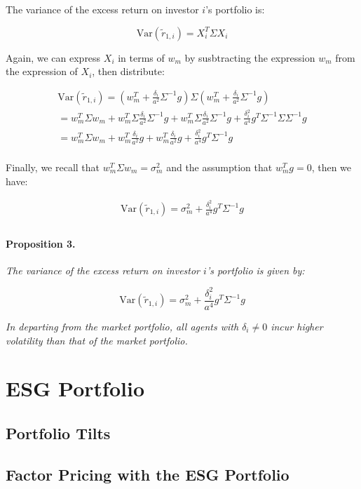 The variance of the excess return on investor $i$'s portfolio is:

\begin{equation}
    \text{Var}(\tilde{r}_{1,i}) = X_i^T \Sigma X_i
\end{equation}

Again, we can express $X_i$ in terms of $w_m$ by susbtracting the expression $w_m$
from the expression of $X_i$, then distribute:

\begin{equation}
    \begin{aligned}
        \text{Var}(\tilde{r}_{1,i}) = (w^T_m + \frac{\delta_i}{a^2} \Sigma^{-1}g) \Sigma (w^T_m + \frac{\delta_i}{a^2} \Sigma^{-1}g) \\
        = w^T_m \Sigma w_m + w^T_m \Sigma \frac{\delta_i}{a^2} \Sigma^{-1}g + w^T_m \Sigma \frac{\delta_i}{a^2} \Sigma^{-1}g + \frac{\delta_i^2}{a^4} g^T \Sigma^{-1} \Sigma \Sigma^{-1} g \\
        = w^T_m \Sigma w_m + w^T_m \frac{\delta_i}{a^2} g + w^T_m \frac{\delta_i}{a^2} g + \frac{\delta_i^2}{a^4} g^T \Sigma^{-1} g \\
    \end{aligned}
\end{equation}

Finally, we recall that $w^T_m \Sigma w_m = \sigma^2_m$ and the assumption 
that $w_m^T g = 0$, then we have:

\begin{equation}
    \begin{aligned}
        \text{Var}(\tilde{r}_{1,i}) = \sigma^2_m + \frac{\delta_i^2}{a^4} g^T \Sigma^{-1} g \\
    \end{aligned}
\end{equation}

\paragraph{Proposition 3.} \textit{The variance of the excess return on
investor $i$'s portfolio is given by:}

\begin{equation}
    \text{Var}(\tilde{r}_{1,i}) = \sigma^2_m + \frac{\delta_i^2}{a^4} g^T \Sigma^{-1} g
\end{equation}

\textit{In departing from the market portfolio, all agents with $\delta_i \neq 0$
incur higher volatility than that of the market portfolio.}


\section{ESG Portfolio}

\subsection{Portfolio Tilts}


\subsection{Factor Pricing with the ESG Portfolio}